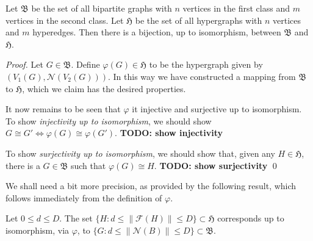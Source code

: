 \begin{lemma}
Let $\mathfrak{B}$ be the set of all bipartite graphs with $n$ vertices in the first class and $m$ vertices in the second class.
Let $\mathfrak{H}$ be the set of all hypergraphs with $n$ vertices and $m$ hyperedges.
Then there is a bijection, up to isomorphism, between $\mathfrak{B}$ and $\mathfrak{H}$.
\end{lemma}
\begin{proof}
Let $G \in \mathfrak{B}$. Define $\varphi(G) \in \mathfrak{H}$ to be the hypergraph given by $(V_1(G), \mathcal{N}(V_2(G)))$.
In this way we have constructed a mapping from $\mathfrak{B}$ to $\mathfrak{H}$, which we claim has the desired properties.

It now remains to be seen that $\varphi$ it injective and surjective up to isomorphism.
To show \emph{injectivity up to isomorphism}, we should show $G \cong G' \Leftrightarrow \varphi(G) \cong \varphi(G')$.
\textbf{TODO: show injectivity}

To show \emph{surjectivity up to isomorphism}, we should show that, given any $H \in \mathfrak{H}$, there is a $G \in \mathfrak{B}$ such that $\varphi(G) \cong H$.
\textbf{TODO: show surjectivity}
\qed
\end{proof}

We shall need a bit more precision, as provided by the following result, which follows immediately from the definition of $\varphi$.

\begin{corollary}
Let $0 \leq d \leq D$. The set $\{ H : d \leq \left\| \mathcal{F}(H) \right\| \leq D \} \subset \mathfrak{H}$ corresponds up to isomorphism, via $\varphi$, to $ \{ G : d \leq \left\| \mathcal{N}(B) \right\| \leq D  \} \subset \mathfrak{B}$.
\end{corollary}


